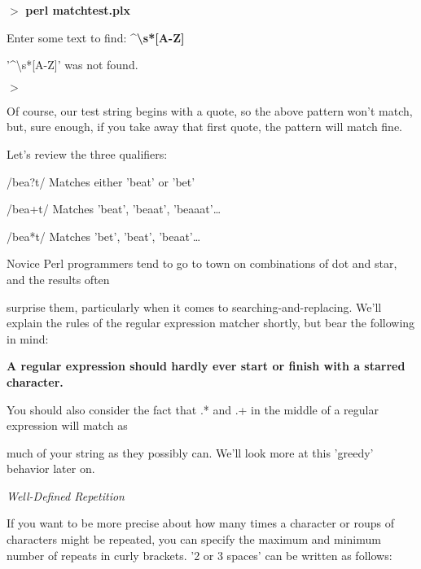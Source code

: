 \documentclass[a4paper,11pt]{book}
\begin{document}
\noindent $>$ \textbf{perl matchtest.plx}

\noindent Enter some text to find: \textbf{\^{}\textbackslash s*[A-Z]}

\noindent '\^{}\textbackslash s*[A-Z]' was not found.

\noindent $>$

\noindent 

\noindent Of course, our test string begins with a quote, so the above pattern won't match, but, sure enough, if you take away that first quote, the pattern will match fine.

\noindent 

\noindent 

\noindent Let's review the three qualifiers:

\noindent 

\noindent /bea?t/ Matches either 'beat' or 'bet'

\noindent 

\noindent /bea+t/ Matches 'beat', 'beaat', 'beaaat'\dots 

\noindent 

\noindent /bea*t/ Matches 'bet', 'beat', 'beaat'\dots 

\noindent 

\noindent Novice Perl programmers tend to go to town on combinations of dot and star, and the results often

\noindent surprise them, particularly when it comes to searching-and-replacing. We'll explain the rules of the regular expression matcher shortly, but bear the following in mind:

\noindent 

\noindent 

\noindent \textbf{A regular expression should hardly ever start or finish with a starred character.}

\noindent 

\noindent 

\noindent You should also consider the fact that .* and .+ in the middle of a regular expression will match as

\noindent much of your string as they possibly can. We'll look more at this 'greedy' behavior later on.

\noindent 

\noindent \textit{Well-Defined Repetition}

\noindent If you want to be more precise about how many times a character or roups of characters might be repeated, you can specify the maximum and minimum number of repeats in curly brackets. '2 or 3 spaces' can be written as follows:
\end{document}

